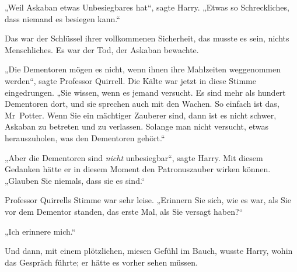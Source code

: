 „Weil Askaban etwas Unbesiegbares hat“, sagte Harry. „Etwas so Schreckliches, dass niemand es besiegen kann.“

Das war der Schlüssel ihrer vollkommenen Sicherheit, das musste es sein, nichts Menschliches. Es war der Tod, der Askaban bewachte.

„Die Dementoren mögen es nicht, wenn ihnen ihre Mahlzeiten weggenommen werden“, sagte Professor Quirrell. Die Kälte war jetzt in diese Stimme eingedrungen. „Sie wissen, wenn es jemand versucht. Es sind mehr als hundert Dementoren dort, und sie sprechen auch mit den Wachen. So einfach ist das, Mr~Potter. Wenn Sie ein mächtiger Zauberer sind, dann ist es nicht schwer, Askaban zu betreten und zu verlassen. Solange man nicht versucht, etwas herauszuholen, was den Dementoren gehört.“

„Aber die Dementoren sind \emph{nicht} unbesiegbar“, sagte Harry. Mit diesem Gedanken hätte er in diesem Moment den Patronuszauber wirken können. „Glauben Sie niemals, dass sie es sind.“

Professor Quirrells Stimme war sehr leise. „Erinnern Sie sich, wie es war, als Sie vor dem Dementor standen, das erste Mal, als Sie versagt haben?“

„Ich erinnere mich.“

Und dann, mit einem plötzlichen, miesen Gefühl im Bauch, wusste Harry, wohin das Gespräch führte; er hätte es vorher sehen müssen.

